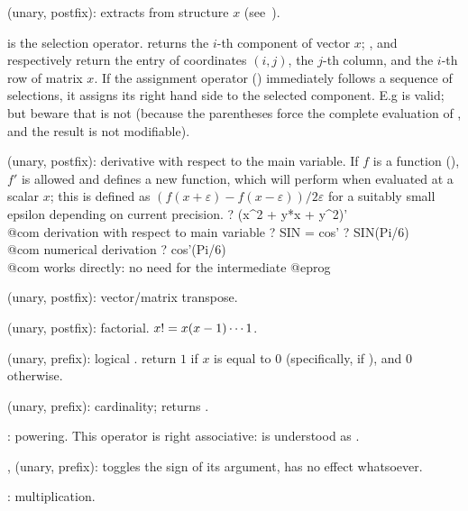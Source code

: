 %
 (unary, postfix):  extracts
 from structure $x$ (see~).

\kbd{[ ]} is the selection operator.  returns the $i$-th
component of vector $x$; ,  and
 respectively return the entry of coordinates $(i,j)$, the
$j$-th column, and the $i$-th row of matrix $x$. If the assignment operator
(\kbd{=}) immediately follows a sequence of selections, it assigns its right
hand side to the selected component. E.g  is valid; but
beware that  is not (because the parentheses force the
complete evaluation of , and the result is not modifiable).

%
 (unary, postfix): derivative with respect to the main variable.
If $f$ is a function (), $f'$ is allowed and defines a new
function, which will perform  when evaluated
at a scalar $x$; this is defined as $(f(x+\varepsilon) - f(x-\varepsilon)) /
2\varepsilon$ for a suitably small epsilon depending on current precision.
\bprog
? (x^2 + y*x + y^2)'  \\@com derivation with respect to main variable 
? SIN = cos'
? SIN(Pi/6)         \\@com numerical derivation
? cos'(Pi/6)        \\@com works directly: no need for the intermediate 
@eprog

\strut\kbd{\til} (unary, postfix): vector/matrix transpose.

\kbd{!} (unary, postfix): factorial. $x{\tt !}=x(x-1)\cdots 1$.

\kbd{!} (unary, prefix): logical .  return $1$ if $x$ is
equal to $0$ (specifically, if ), and $0$ otherwise.

%
\kbd{\#} (unary, prefix): cardinality;  returns .

%
\kbd{\pow}: powering. This operator is right associative:
 is understood as .

%
\kbd{+}, \kbd{-} (unary, prefix): \kbd{-} toggles the sign of its argument,
\kbd{+} has no effect whatsoever.

%
\kbd{*}: multiplication.

